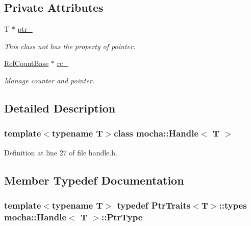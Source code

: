 \subsection*{Private Attributes}
\begin{DoxyCompactItemize}
\item 
T $\ast$ \hyperlink{classmocha_1_1_handle_a58e82f1bbee46886fee9b433ecbae776}{ptr\_\-}
\begin{DoxyCompactList}\small\item\em This class not has the property of pointer. \end{DoxyCompactList}\item 
\hyperlink{classmocha_1_1_ref_count_base}{RefCountBase} $\ast$ \hyperlink{classmocha_1_1_handle_a97ddcc3a71592fcd487ef19f837e6b62}{rc\_\-}
\begin{DoxyCompactList}\small\item\em Manage counter and pointer. \end{DoxyCompactList}\end{DoxyCompactItemize}


\subsection{Detailed Description}
\subsubsection*{template$<$typename T$>$class mocha::Handle$<$ T $>$}



Definition at line 27 of file handle.h.



\subsection{Member Typedef Documentation}
\hypertarget{classmocha_1_1_handle_ab0f5eb08d7783139f6c6c17f2e1098d8}{
\subsubsection[{PtrType}]{\setlength{\rightskip}{0pt plus 5cm}template$<$typename T$>$ typedef {\bf PtrTraits}$<$T$>$::types {\bf mocha::Handle}$<$ T $>$::{\bf PtrType}}}
\label{classmocha_1_1_handle_ab0f5eb08d7783139f6c6c17f2e1098d8}


